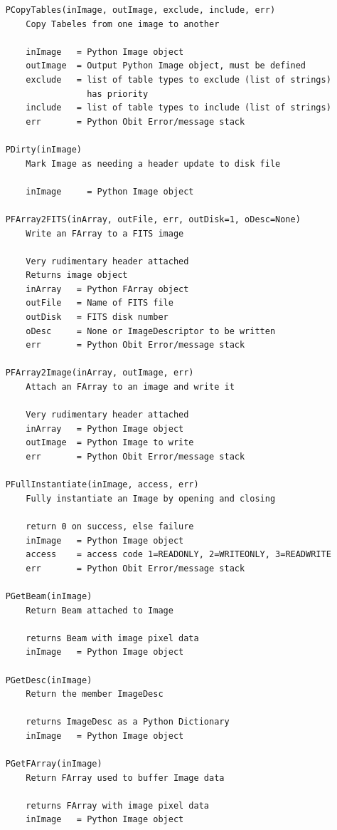 \documentclass[11pt]{report}
\begin{document}
\begin{verbatim}
    PCopyTables(inImage, outImage, exclude, include, err)
        Copy Tabeles from one image to another
        
        inImage   = Python Image object
        outImage  = Output Python Image object, must be defined
        exclude   = list of table types to exclude (list of strings)
                    has priority
        include   = list of table types to include (list of strings)
        err       = Python Obit Error/message stack
    
    PDirty(inImage)
        Mark Image as needing a header update to disk file
        
        inImage     = Python Image object
    
    PFArray2FITS(inArray, outFile, err, outDisk=1, oDesc=None)
        Write an FArray to a FITS image
        
        Very rudimentary header attached
        Returns image object
        inArray   = Python FArray object
        outFile   = Name of FITS file
        outDisk   = FITS disk number
        oDesc     = None or ImageDescriptor to be written
        err       = Python Obit Error/message stack
    
    PFArray2Image(inArray, outImage, err)
        Attach an FArray to an image and write it
        
        Very rudimentary header attached
        inArray   = Python Image object
        outImage  = Python Image to write
        err       = Python Obit Error/message stack
    
    PFullInstantiate(inImage, access, err)
        Fully instantiate an Image by opening and closing
        
        return 0 on success, else failure
        inImage   = Python Image object
        access    = access code 1=READONLY, 2=WRITEONLY, 3=READWRITE
        err       = Python Obit Error/message stack
    
    PGetBeam(inImage)
        Return Beam attached to Image
        
        returns Beam with image pixel data
        inImage   = Python Image object
    
    PGetDesc(inImage)
        Return the member ImageDesc
        
        returns ImageDesc as a Python Dictionary
        inImage   = Python Image object
    
    PGetFArray(inImage)
        Return FArray used to buffer Image data
        
        returns FArray with image pixel data
        inImage   = Python Image object
    

\end{verbatim}
\end{document}
